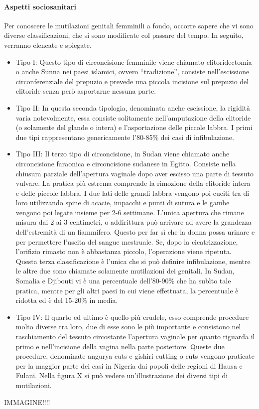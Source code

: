 \paragraph{Aspetti sociosanitari}
Per conoscere le mutilazioni genitali femminili a fondo, occorre sapere che vi sono diverse classificazioni, che si sono modificate col passare del tempo. In seguito, verranno elencate e spiegate. 
\begin{itemize}
    \item Tipo I: Questo tipo di circoncisione femminile viene chiamato clitoridectomia o anche Sunna nei paesi islamici, ovvero “tradizione”, consiste nell’escissione circonferenziale del prepuzio e prevede una piccola incisione sul prepuzio del clitoride senza però asportarne nessuna parte. 
	\item{Tipo II: In questa seconda tipologia, denominata anche escissione, la rigidità varia notevolmente, essa consiste solitamente nell’amputazione della clitoride (o solamente del glande o intera) e l’asportazione delle piccole labbra.}
I primi due tipi rappresentano genericamente l’80-85\% dei casi di infibulazione.
\item {Tipo III: Il terzo tipo di circoncisione, in Sudan viene chiamato anche circoncisione faraonica e circoncisione sudanese in Egitto. Consiste nella chiusura parziale dell'apertura vaginale dopo aver escisso una parte di tessuto vulvare. La pratica più estrema comprende la rimozione della clitoride intera e delle piccole labbra. I due lati delle grandi labbra vengono poi cuciti tra di loro utilizzando spine di acacie, impacchi e punti di sutura e le gambe vengono poi legate insieme per 2-6 settimane. L’unica apertura che rimane misura dai 2 ai 3 centimetri, o addirittura può arrivare ad avere la grandezza dell’estremità di un fiammifero. Questo per far sì che la donna possa urinare e per permettere l’uscita del sangue mestruale. Se, dopo la cicatrizzazione, l’orifizio rimasto non è abbastanza piccolo, l’operazione viene ripetuta. Questa terza classificazione è l’unica che si può definire infibulazione, mentre le altre due sono chiamate solamente mutilazioni dei genitali. In Sudan, Somalia e Djibouti vi è una percentuale dell’80-90\% che ha subìto tale pratica, mentre per gli altri paesi in cui viene effettuata, la percentuale è ridotta ed è del 15-20\% in media.}
\item {Tipo IV: Il quarto ed ultimo è quello più crudele, esso comprende procedure molto diverse tra loro, due di esse sono le più importante e consistono nel raschiamento del tessuto circostante l’apertura vaginale per quanto riguarda il primo e nell’incisione della vagina nella parte posteriore. Queste due procedure, denominate angurya cuts e gishiri cutting o cuts vengono praticate per la maggior parte dei casi in Nigeria dai popoli delle regioni di Hausa e Fulani.}
Nella figura X si può vedere un’illustrazione dei diversi tipi di mutilazioni. 
\end{itemize}
IMMAGINE!!!!

